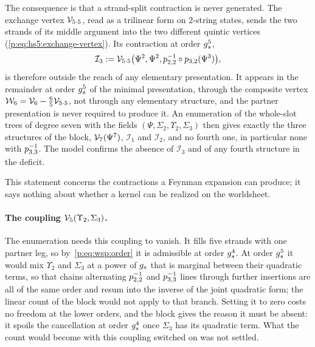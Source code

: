 The consequence is that a strand-split contraction is never generated.
The exchange vertex $\mathcal{V}_{5 \cdot 5}$, read as a trilinear form on $2$-string states, sends the two strands of its middle argument into the two different quintic vertices (\cref{p:eq:hs5:exchange-vertex}).
Its contraction at order $g_s^5$,
\begin{equation}
  \mathcal I_3
    := \mathcal{V}_{5 \cdot 5}\big( \Psi^2, \Psi^2, p_{2,2}^{-1} \circ p_{3,2}(\Psi^3) \big),
\end{equation}
is therefore outside the reach of any elementary presentation.
It appears in the remainder at order $g_s^5$ of the minimal presentation, through the composite vertex $\mathcal{W}_{6} = \mathcal{V}_{6} - \frac{6}{5} \mathcal{V}_{5 \cdot 5}$, not through any elementary structure, and the partner presentation is never required to produce it.
An enumeration of the whole-slot trees of degree seven with the fields $(\Psi, \Sigma_2, \Upsilon_2, \Sigma_3)$ then gives exactly the three structures of the block, $\mathcal{V}_{7}(\Psi^7)$, $\mathcal I_1$ and $\mathcal I_2$, and no fourth one, in particular none with $p_{3,3}^{-1}$.
The model confirms the absence of $\mathcal I_3$ and of any fourth structure in the deficit.

This statement concerns the contractions a Feynman expansion can produce; it says nothing about whether a kernel can be realized on the worldsheet.

\paragraph{The coupling $\mathcal{V}_{5}(\Upsilon_2, \Sigma_3)$.}
The enumeration needs this coupling to vanish.
It fills five strands with one partner leg, so by~\eqref{p:eq:wsp:order} it is admissible at order $g_s^4$.
At order $g_s^5$ it would mix $\Upsilon_2$ and $\Sigma_3$ at a power of $g_s$ that is marginal between their quadratic terms, so that chains alternating $p_{2,2}^{-1}$ and $p_{3,3}^{-1}$ lines through further insertions are all of the same order and resum into the inverse of the joint quadratic form; the linear count of the block would not apply to that branch.
Setting it to zero costs no freedom at the lower orders, and the block gives the reason it must be absent: it spoils the cancellation at order $g_s^4$ once $\Sigma_3$ has its quadratic term.
What the count would become with this coupling switched on was not settled.

